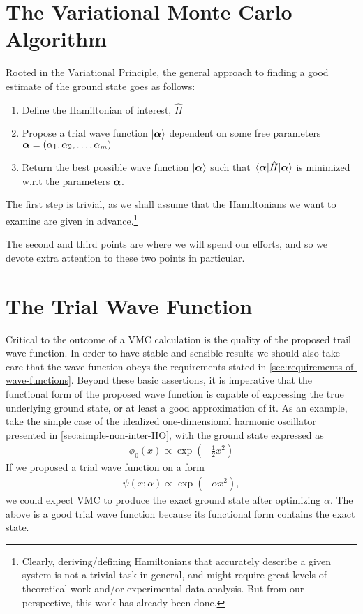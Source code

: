 \documentclass[Thesis.tex]{subfiles}
\begin{document}
\section{The Variational Monte Carlo Algorithm}

Rooted in the Variational Principle, the general approach to finding a good estimate of
the ground state goes as follows:

\begin{enumerate}
    \item Define the Hamiltonian of interest, $\hat H$
    \item Propose a trial wave function $| \bm{\alpha} \rangle$ dependent on some free parameters
        $\bm{\alpha}=\qty(\alpha_1, \alpha_2,\dots, \alpha_m)$
    \item Return the best possible wave function $| \bm{\alpha} \rangle$ such that $\expval{\hat
        H}{\bm{\alpha}}$ is minimized w.r.t the parameters $\bm{\alpha}$.
\end{enumerate}
The first step is trivial, as we shall assume that the Hamiltonians we want to examine are
given in advance.\footnote{Clearly, deriving/defining Hamiltonians that accurately describe a given
system is not a trivial task in general, and might require great levels of theoretical
work and/or experimental data analysis. But from our perspective, this work has already
been done.}

The second and third points are where we will spend our efforts, and so we devote extra
attention to these two points in particular.


\section{The Trial Wave Function}

Critical to the outcome of a VMC calculation is the quality of the proposed trail wave
function. In order to have stable and sensible results we should also take care that the
wave function obeys the requirements stated in
\autoref{sec:requirements-of-wave-functions}. Beyond these basic assertions, it is
imperative that the functional form of the proposed wave function is capable of expressing
the true underlying ground state, or at least a good approximation of it. As an example,
take the simple case of the idealized one-dimensional harmonic oscillator presented in
\autoref{sec:simple-non-inter-HO}, with the ground state expressed as
\begin{align}
    \phi_0(x) \propto \exp(- \frac{1}{2} x^2)
\end{align}
If we proposed a trial wave function on a form
\begin{align}
    \psi(x; \alpha)\propto \exp(- \alpha x^2),
\end{align}
we could expect VMC to produce the exact ground state after optimizing $\alpha$. The above
is a good trial wave function because its functional form contains the exact state.
\end{document}
